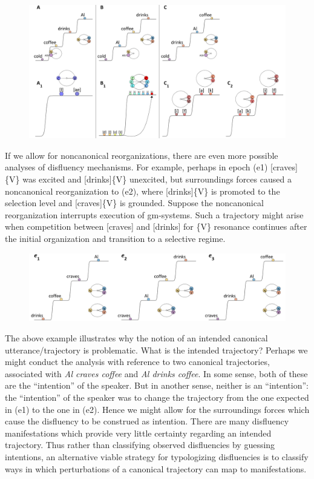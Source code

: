   
\begin{figure}
\includegraphics[width=\textwidth]{figures/Tilsen-img59.png}
\caption{\missingcaption}
\label{fig:4:8b}
\end{figure}
 

  If we allow for noncanonical reorganizations, there are even more possible analyses of disfluency mechanisms. For example, perhaps in epoch (e1) [craves]\{V\} was excited and [drinks]\{V\} unexcited, but surroundings forces caused a noncanonical reorganization to (e2), where [drinks]\{V\} is promoted to the selection level and [craves]\{V\} is grounded. Suppose the noncanonical reorganization interrupts execution of gm-systems. Such a trajectory might arise when competition between [craves] and [drinks] for \{V\} resonance continues after the initial organization and transition to a selective regime. 

  
\begin{figure}
\includegraphics[width=\textwidth]{figures/Tilsen-img60.png}
\caption{\missingcaption}
\label{fig:4:10}
\end{figure}
 

  The above example illustrates why the notion of an intended canonical utterance/trajectory is problematic. What is the intended trajectory? Perhaps we might conduct the analysis with reference to two canonical trajectories, associated with \textit{Al craves coffee} and \textit{Al drinks coffee}. In some sense, both of these are the “intention” of the speaker. But in another sense, neither is an “intention”: the “intention” of the speaker was to change the trajectory from the one expected in (e1) to the one in (e2). Hence we might allow for the surroundings forces which cause the disfluency to be construed as intention. There are many disfluency manifestations which provide very little certainty regarding an intended trajectory. Thus rather than classifying observed disfluencies by guessing intentions, an alternative viable strategy for typologizing disfluencies is to classify ways in which perturbations of a canonical trajectory can map to manifestations.

